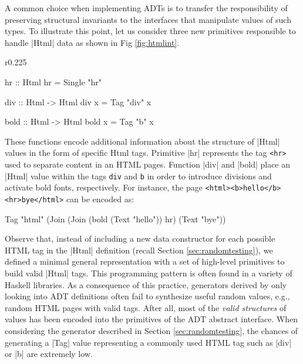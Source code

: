 A common choice when implementing ADTs is to transfer the responsibility of
preserving structural invariants to the interfaces that manipulate values of
such types.
%
To illustrate this point, let us consider three new primitives responsible to
handle |Html| data as shown in Fig \ref{fig:htmlint}.
%
\begin{wrapfigure}{r}{0.225\textwidth}
\vspace{-10pt}
\hspace{-10pt}
\begin{code}
hr :: Html
hr = Single "hr"

div :: Html -> Html
div x = Tag "div" x

bold :: Html -> Html
bold x = Tag "b" x
\end{code}
\caption{Abtract interface of the type |Html|.}
\label{fig:htmlint}
\vspace{-10pt}
\end{wrapfigure}
%
%
These functions encode additional information about the structure of |Html|
values in the form of specific Html tags.
%
Primitive |hr| represents the tag \texttt{<hr>} used to separate content in an
HTML pages.
%
Function |div| and |bold| place an |Html| value within the tags \texttt{div} and
\texttt{b} in order to introduce divisions and activate bold fonts,
respectively.
%
For instance, the page \texttt{<html><b>hello</b><hr>bye</html>} can be encoded
as:

\begin{code}
Tag "html" (Join (Join
  (bold (Text "hello")) hr) (Text "bye"))
\end{code}

%
Observe that, instead of including a new data constructor for each possible HTML
tag in the |Html| definition (recall Section \ref{sec:randomtesting}), we
defined a minimal general representation with a set of high-level primitives to
build valid |Html| tags.
%
%
This programming pattern is often found in a variety of Haskell libraries.
%
%
As a consequence of this practice, generators derived by only looking into ADT
definitions often fail to synthesize useful random values, e.g., random HTML
pages with valid tags.
%
After all, most of the \emph{valid structures} of values has been encoded into
the primitives of the ADT abstract interface.
%
When considering the generator described in Section \ref{sec:randomtesting}, the
chances of generating a |Tag| value representing a commonly used HTML tag such
as |div| or |b| are extremely low.


